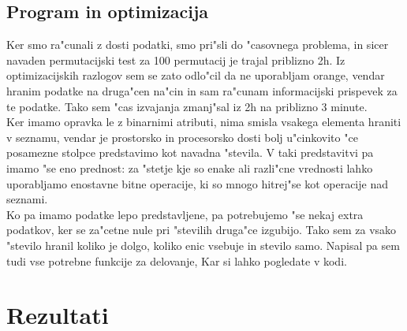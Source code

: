 \documentclass[a4paper,11pt]{article}
\begin{document}
\subsection{Program in optimizacija}

Ker smo ra"cunali z dosti podatki, smo pri"sli do "casovnega problema, in sicer navaden permutacijski test za 100 permutacij je trajal priblizno 2h. Iz optimizacijskih razlogov sem se zato odlo"cil da ne uporabljam orange, vendar hranim podatke na druga"cen na"cin in sam ra"cunam informacijski prispevek za te podatke. Tako sem "cas izvajanja zmanj"sal iz 2h na priblizno 3 minute. \\

Ker imamo opravka le z binarnimi atributi, nima smisla vsakega elementa hraniti v seznamu, vendar je prostorsko in procesorsko dosti bolj u"cinkovito "ce posamezne stolpce predstavimo kot navadna "stevila. V taki predstavitvi pa imamo "se eno prednost: za "stetje kje so enake ali razli"cne vrednosti lahko uporabljamo enostavne bitne operacije, ki so mnogo hitrej"se kot operacije nad seznami.\\

Ko pa imamo podatke lepo predstavljene, pa potrebujemo "se nekaj extra podatkov, ker se za"cetne nule pri "stevilih druga"ce izgubijo. Tako sem za vsako "stevilo hranil koliko je dolgo, koliko enic vsebuje in stevilo samo. Napisal pa sem tudi vse potrebne funkcije za delovanje, Kar si lahko pogledate v kodi.



\section{Rezultati}
\end{document}
